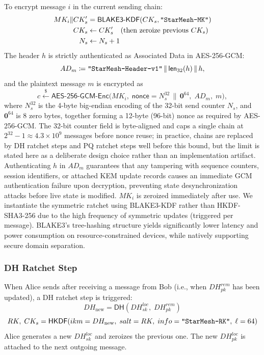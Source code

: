 \documentclass[11pt,a4paper]{article}
\theoremstyle{remark}
\theoremstyle{plain}
\newcommand{\getsr}{\stackrel{\$}{\leftarrow}}
\newcommand{\HKDF}{\mathsf{HKDF}}
\newcommand{\DHop}{\mathsf{DH}}
\newcommand{\flen}[1]{\mathsf{len}_{32}(#1)}
\newcommand{\strlit}[1]{\text{\upshape\texttt{"#1"}}}
\begin{document}
To encrypt message $i$ in the current sending chain:
\begin{align*}
  MK_i \| CK_s' &= \mathsf{BLAKE3\text{-}KDF}(CK_s, \strlit{StarMesh-MK}) \\
  CK_s &\leftarrow CK_s' \quad (\text{then zeroize previous } CK_s) \\
  N_s &\leftarrow N_s + 1
\end{align*}
The header $h$ is strictly authenticated as Associated Data in AES-256-GCM:
\[
  AD_m \coloneqq \strlit{StarMesh-Header-v1} \,\|\, \flen{h} \,\|\, h,
\]
and the plaintext message $m$ is encrypted as
\[
  c \getsr \mathsf{AES\text{-}256\text{-}GCM}\text{-}\mathsf{Enc}\bigl(MK_i,\; \mathsf{nonce} = N_s^{32} \,\|\, \mathbf{0}^{64},\; AD_m,\; m\bigr),
\]
where $N_s^{32}$ is the 4-byte big-endian encoding of the 32-bit send counter $N_s$, and
$\mathbf{0}^{64}$ is 8 zero bytes, together forming a 12-byte (96-bit) nonce as required by
AES-256-GCM.  The 32-bit counter field is byte-aligned and caps a single chain at
$2^{32}-1 \approx 4.3 \times 10^9$ messages before nonce reuse; in practice, chains are
replaced by DH ratchet steps and PQ ratchet steps well before this bound, but the limit
is stated here as a deliberate design choice rather than an implementation artifact.
Authenticating $h$ in $AD_m$ guarantees that any tampering with sequence counters, session identifiers,
or attached KEM update records causes an immediate GCM authentication failure upon decryption,
preventing state desynchronization attacks before live state is modified.
$MK_i$ is zeroized immediately after use. We instantiate the symmetric ratchet using BLAKE3-KDF rather than HKDF-SHA3-256 due to the high frequency of symmetric updates (triggered per message). BLAKE3's tree-hashing structure yields significantly lower latency and power consumption on resource-constrained devices, while natively supporting secure domain separation.

\subsubsection{DH Ratchet Step}

When Alice sends after receiving a message from Bob (i.e., when $DH^{rem}_{pk}$ has been
updated), a DH ratchet step is triggered:
\[
  DH_{\mathrm{new}} = \DHop(DH^{loc}_{sk},\; DH^{rem}_{pk})
\]
\[
  RK,\; CK_s = \HKDF\!\left(ikm = DH_{\mathrm{new}},\; salt = RK,\;
                             info = \strlit{StarMesh-RK},\; \ell = 64\right)
\]
Alice generates a new $DH^{loc}_{sk}$ and zeroizes the previous one.  The new $DH^{loc}_{pk}$
is attached to the next outgoing message.
\end{document}
